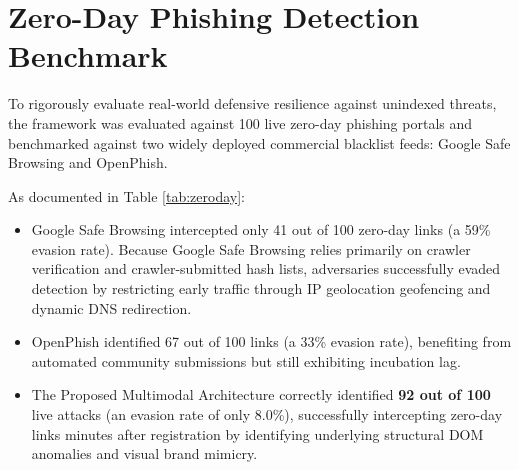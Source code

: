 \section{Zero-Day Phishing Detection Benchmark}
To rigorously evaluate real-world defensive resilience against unindexed threats, the framework was evaluated against 100 live zero-day phishing portals and benchmarked against two widely deployed commercial blacklist feeds: Google Safe Browsing and OpenPhish.

As documented in Table \ref{tab:zeroday}:
\begin{table}[htbp]
\centering
{}
\vspace{0.2cm}
\caption{Zero-Day Detection Benchmark on 100 Live Unindexed Phishing Websites}
\label{tab:zeroday}
\end{table}

\begin{itemize}
\item Google Safe Browsing intercepted only 41 out of 100 zero-day links (a 59\% evasion rate). Because Google Safe Browsing relies primarily on crawler verification and crawler-submitted hash lists, adversaries successfully evaded detection by restricting early traffic through IP geolocation geofencing and dynamic DNS redirection.
\item OpenPhish identified 67 out of 100 links (a 33\% evasion rate), benefiting from automated community submissions but still exhibiting incubation lag.
\item The Proposed Multimodal Architecture correctly identified \textbf{92 out of 100} live attacks (an evasion rate of only 8.0\%), successfully intercepting zero-day links minutes after registration by identifying underlying structural DOM anomalies and visual brand mimicry.
\end{itemize}

